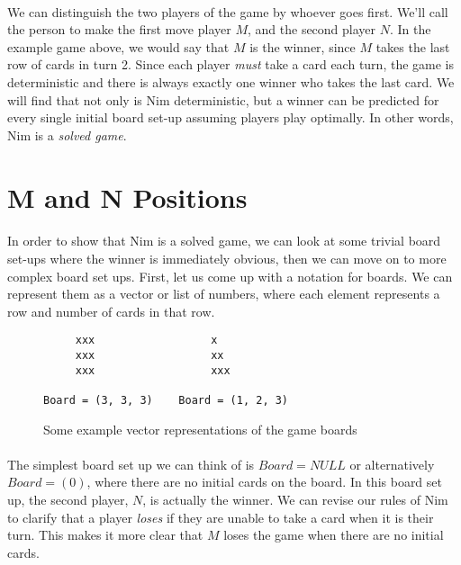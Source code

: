 \documentclass{article}
\begin{document}
\paragraph{}
We can distinguish the two players of the game by whoever goes first. We'll call the person to make the first move player $M$, and the second player $N$. In the example game above, we would say that $M$ is the winner, since $M$ takes the last row of cards in turn 2. Since each player \textit{must} take a card each turn, the game is deterministic and there is always exactly one winner who takes the last card. We will find that not only is Nim deterministic, but a winner can be predicted for every single initial board set-up assuming players play optimally. In other words, Nim is a \textit{solved game}.

\pagebreak
\section*{M and N Positions}

\paragraph{}
In order to show that Nim is a solved game, we can look at some trivial board set-ups where the winner is immediately obvious, then we can move on to more complex board set ups. First, let us come up with a notation for boards. We can represent them as a vector or list of numbers, where each element represents a row and number of cards in that row.\\

\begin{figure}[h]
    \center
    \begin{BVerbatim}
     xxx                  x
     xxx                  xx
     xxx                  xxx

Board = (3, 3, 3)    Board = (1, 2, 3)
    \end{BVerbatim}
    \caption{Some example vector representations of the game boards}
\end{figure}

\paragraph{}
The simplest board set up we can think of is $Board = NULL$ or alternatively $Board = (0)$, where there are no initial cards on the board. In this board set up, the second player, $N$, is actually the winner. We can revise our rules of Nim to clarify that a player \textit{loses} if they are unable to take a card when it is their turn. This makes it more clear that $M$ loses the game when there are no initial cards.
\end{document}
